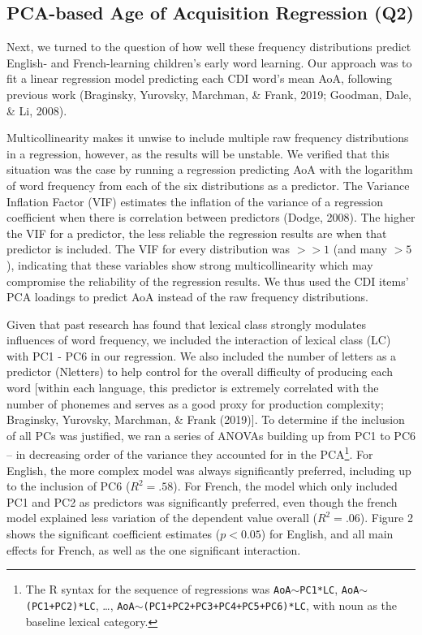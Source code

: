 \documentclass[10pt, letterpaper]{article}
\begin{document}
\hypertarget{pca-based-age-of-acquisition-regression-q2}{%
\subsection{PCA-based Age of Acquisition Regression
(Q2)}\label{pca-based-age-of-acquisition-regression-q2}}

Next, we turned to the question of how well these frequency
distributions predict English- and French-learning children's early word
learning. Our approach was to fit a linear regression model predicting
each CDI word's mean AoA, following previous work (Braginsky, Yurovsky,
Marchman, \& Frank, 2019; Goodman, Dale, \& Li, 2008).

Multicollinearity makes it unwise to include multiple raw frequency
distributions in a regression, however, as the results will be unstable.
We verified that this situation was the case by running a regression
predicting AoA with the logarithm of word frequency from each of the six
distributions as a predictor. The Variance Inflation Factor (VIF)
estimates the inflation of the variance of a regression coefficient when
there is correlation between predictors (Dodge, 2008). The higher the
VIF for a predictor, the less reliable the regression results are when
that predictor is included. The VIF for every distribution was \(>>1\)
(and many \(>5\)), indicating that these variables show strong
multicollinearity which may compromise the reliability of the regression
results. We thus used the CDI items' PCA loadings to predict AoA instead
of the raw frequency distributions.

Given that past research has found that lexical class strongly modulates
influences of word frequency, we included the interaction of lexical
class (LC) with PC1 - PC6 in our regression. We also included the number
of letters as a predictor (Nletters) to help control for the overall
difficulty of producing each word {[}within each language, this
predictor is extremely correlated with the number of phonemes and serves
as a good proxy for production complexity; Braginsky, Yurovsky,
Marchman, \& Frank (2019){]}. To determine if the inclusion of all PCs
was justified, we ran a series of ANOVAs building up from PC1 to PC6 --
in decreasing order of the variance they accounted for in the
PCA\footnote{The R syntax for the sequence of regressions was
  \texttt{AoA}\(\sim\)\texttt{PC1*LC},
  \texttt{AoA}\(\sim\)\texttt{(PC1+PC2)*LC}, \ldots,
  \texttt{AoA}\(\sim\)\texttt{(PC1+PC2+PC3+PC4+PC5+PC6)*LC}, with noun
  as the baseline lexical category.}. For English, the more complex
model was always significantly preferred, including up to the inclusion
of PC6 (\(R^2 = .58\)). For French, the model which only included PC1
and PC2 as predictors was significantly preferred, even though the
french model explained less variation of the dependent value overall
(\(R^2 = .06\)). Figure 2 shows the significant coefficient estimates
(\(p<0.05\)) for English, and all main effects for French, as well as
the one significant interaction.
\end{document}
